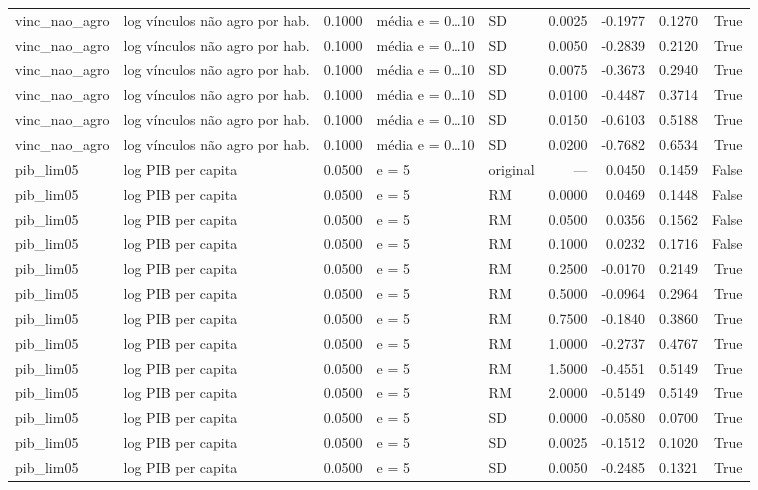 \begin{table}
{\begin{tabular}{llrllrrrr}
vinc\_nao\_agro & log vínculos não agro por hab. & 0.1000 & média e = 0…10 & SD & 0.0025 & -0.1977 & 0.1270 & True \\
vinc\_nao\_agro & log vínculos não agro por hab. & 0.1000 & média e = 0…10 & SD & 0.0050 & -0.2839 & 0.2120 & True \\
vinc\_nao\_agro & log vínculos não agro por hab. & 0.1000 & média e = 0…10 & SD & 0.0075 & -0.3673 & 0.2940 & True \\
vinc\_nao\_agro & log vínculos não agro por hab. & 0.1000 & média e = 0…10 & SD & 0.0100 & -0.4487 & 0.3714 & True \\
vinc\_nao\_agro & log vínculos não agro por hab. & 0.1000 & média e = 0…10 & SD & 0.0150 & -0.6103 & 0.5188 & True \\
vinc\_nao\_agro & log vínculos não agro por hab. & 0.1000 & média e = 0…10 & SD & 0.0200 & -0.7682 & 0.6534 & True \\
pib\_lim05 & log PIB per capita & 0.0500 & e = 5 & original & — & 0.0450 & 0.1459 & False \\
pib\_lim05 & log PIB per capita & 0.0500 & e = 5 & RM & 0.0000 & 0.0469 & 0.1448 & False \\
pib\_lim05 & log PIB per capita & 0.0500 & e = 5 & RM & 0.0500 & 0.0356 & 0.1562 & False \\
pib\_lim05 & log PIB per capita & 0.0500 & e = 5 & RM & 0.1000 & 0.0232 & 0.1716 & False \\
pib\_lim05 & log PIB per capita & 0.0500 & e = 5 & RM & 0.2500 & -0.0170 & 0.2149 & True \\
pib\_lim05 & log PIB per capita & 0.0500 & e = 5 & RM & 0.5000 & -0.0964 & 0.2964 & True \\
pib\_lim05 & log PIB per capita & 0.0500 & e = 5 & RM & 0.7500 & -0.1840 & 0.3860 & True \\
pib\_lim05 & log PIB per capita & 0.0500 & e = 5 & RM & 1.0000 & -0.2737 & 0.4767 & True \\
pib\_lim05 & log PIB per capita & 0.0500 & e = 5 & RM & 1.5000 & -0.4551 & 0.5149 & True \\
pib\_lim05 & log PIB per capita & 0.0500 & e = 5 & RM & 2.0000 & -0.5149 & 0.5149 & True \\
pib\_lim05 & log PIB per capita & 0.0500 & e = 5 & SD & 0.0000 & -0.0580 & 0.0700 & True \\
pib\_lim05 & log PIB per capita & 0.0500 & e = 5 & SD & 0.0025 & -0.1512 & 0.1020 & True \\
pib\_lim05 & log PIB per capita & 0.0500 & e = 5 & SD & 0.0050 & -0.2485 & 0.1321 & True \\

\end{tabular}}
\end{table}
